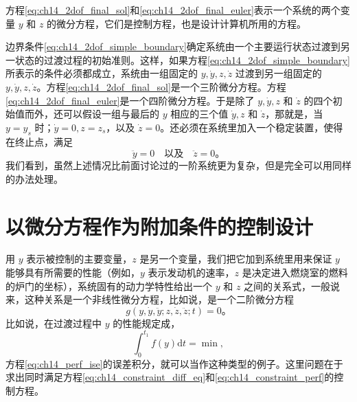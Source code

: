 方程\eqref{eq:ch14_2dof_final_sol}和\eqref{eq:ch14_2dof_final_euler}表示一个系统的两个变量 $y$ 和 $z$ 的微分方程，它们是控制方程，也是设计计算机所用的方程。

边界条件\eqref{eq:ch14_2dof_simple_boundary}确定系统由一个主要运行状态过渡到另一状态的过渡过程的初始准则。这样，如果方程\eqref{eq:ch14_2dof_simple_boundary}所表示的条件必须都成立，系统由一组固定的 $y,\dot{y},z,\dot{z}$ 过渡到另一组固定的 $y,\dot{y},z,\dot{z}$。方程\eqref{eq:ch14_2dof_final_sol}是一个三阶微分方程。方程\eqref{eq:ch14_2dof_final_euler}是一个四阶微分方程。于是除了 $y,\dot{y},z$ 和 $\dot{z}$ 的四个初始值而外，还可以假设一组与最后的 $y$ 相应的三个值 $\dot{y},z$ 和 $\dot{z}$，那就是，当 $y=y_s$ 时；$\dot{y}=0,z=z_s$，以及 $\dot{z}=0$。还必须在系统里加入一个稳定装置，使得在终止点，满足
\begin{equation*}
\ddot{y}=0 \quad\text{以及}\quad \ddot{z}=0。
\end{equation*}
我们看到，虽然上述情况比前面讨论过的一阶系统更为复杂，但是完全可以用同样的办法处理。

\section{以微分方程作为附加条件的控制设计}
用 $y$ 表示被控制的主要变量，$z$ 是另一个变量，我们把它加到系统里用来保证 $y$ 能够具有所需要的性能（例如，$y$ 表示发动机的速率，$z$ 是决定进入燃烧室的燃料的炉门的坐标），系统固有的动力学特性给出一个 $y$ 和 $z$ 之间的关系式，一般说来，这种关系是一个非线性微分方程，比如说，是一个二阶微分方程
\begin{equation}
g(y,\dot{y},\ddot{y};z,\dot{z},\ddot{z};t) = 0。
\label{eq:ch14_constraint_diff_eq}
\end{equation}
比如说，在过渡过程中 $y$ 的性能规定成，
\begin{equation}
\int_{0}^{t_1} f(y)\mathrm{d}t = \min,
\label{eq:ch14_constraint_perf}
\end{equation}
方程\eqref{eq:ch14_perf_ise}的误差积分，就可以当作这种类型的例子。这里问题在于求出同时满足方程\eqref{eq:ch14_constraint_diff_eq}和\eqref{eq:ch14_constraint_perf}的控制方程。

